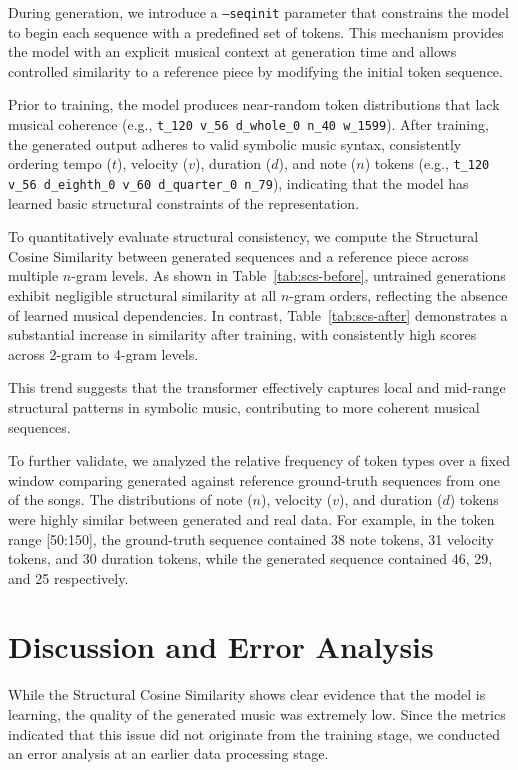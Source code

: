 \documentclass{article}
\begin{document}
During generation, we introduce a \texttt{--seqinit} parameter that constrains the model to begin each sequence with a predefined set of tokens.
This mechanism provides the model with an explicit musical context at generation time and allows controlled similarity to a reference piece by modifying the initial token sequence.

Prior to training, the model produces near-random token distributions that lack musical coherence (e.g., \texttt{t\_120 v\_56 d\_whole\_0 n\_40 w\_1599}). 
After training, the generated output adheres to valid symbolic music syntax, consistently ordering tempo ($t$), velocity ($v$), duration ($d$), and note ($n$) tokens (e.g., \texttt{t\_120 v\_56 d\_eighth\_0 v\_60 d\_quarter\_0 n\_79}), indicating that the model has learned basic structural constraints of the representation.

To quantitatively evaluate structural consistency, we compute the Structural Cosine Similarity between generated sequences and a reference piece across multiple $n$-gram levels. 
As shown in Table~\ref{tab:scs-before}, untrained generations exhibit negligible structural similarity at all $n$-gram orders, reflecting the absence of learned musical dependencies. 
In contrast, Table~\ref{tab:scs-after} demonstrates a substantial increase in similarity after training, with consistently high scores across 2-gram to 4-gram levels. 

This trend suggests that the transformer effectively captures local and mid-range structural patterns in symbolic music, contributing to more coherent musical sequences.

To further validate, we analyzed the relative frequency of token types over a fixed window comparing generated against reference ground-truth sequences from one of the songs.
The distributions of note ($n$), velocity ($v$), and duration ($d$) tokens were highly similar between generated and real data.
For example, in the token range [50:150], the ground-truth sequence contained 38 note tokens, 31 velocity tokens, and 30 duration tokens, while the generated sequence contained 46, 29, and 25 respectively.

\section{Discussion and Error Analysis}

While the Structural Cosine Similarity shows clear evidence that the model is learning, the quality of the generated music was extremely low. Since the metrics indicated that this issue did not originate from the training stage, we conducted an error analysis at an earlier data processing stage.
\end{document}
